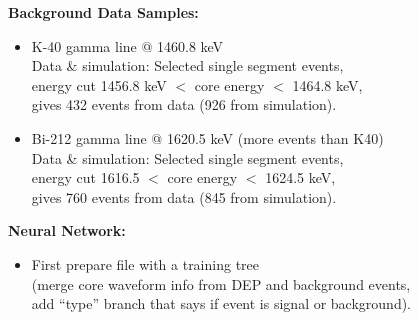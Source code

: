\documentclass[landscape]{slides}
\begin{document}
\begin{slide}

\textbf{Background Data Samples:}

\begin{itemize}

\item K-40 gamma line @ 1460.8 keV \\
	$ $ \\
	Data \& simulation: Selected single segment events,
	\\ energy cut 1456.8 keV  $<$ core energy $<$ 1464.8 keV,\\
	gives 432 events from data (926 from simulation).

\item Bi-212 gamma line @ 1620.5 keV (more events than K40) \\
	$ $ \\
	Data \& simulation: Selected single segment events,
	\\ energy cut 1616.5 $<$ core energy $<$ 1624.5 keV,\\
	gives 760 events from data (845 from simulation).

\end{itemize}

\end{slide}

\begin{slide}

\textbf{Neural Network:}

\begin{itemize}

\item First prepare file with a training tree \\
	
     (merge core waveform info from DEP and background events, \\
     add ``type'' branch that says if event is signal or background).

\end{itemize}

\end{slide}
\end{document}
